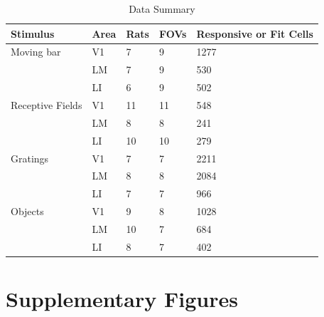 
\begin{table}[h]
  \caption{Data Summary}
  \centering
  \begin{tabular}{lllll}
    \toprule
    Stimulus & Area & Rats & FOVs & Responsive or Fit Cells   \\
    \midrule
    Moving bar & V1  & 7 & 9 & 1277        \\
               & LM  & 7 & 9 & 530         \\
               & LI  & 6 & 9 & 502          \\
    \midrule
    Receptive Fields & V1  & 11 & 11 & 548  \\
                     & LM  & 8 & 8 & 241   \\
                     & LI  & 10 & 10 & 279    \\
    \midrule
    Gratings & V1  & 7 & 7 & 2211     \\
             & LM  & 8 & 8 & 2084     \\
             & LI  & 7 & 7 & 966     \\
    \midrule
    Objects  & V1  & 9 & 8 & 1028   \\
             & LM  & 10 & 7 & 684   \\
             & LI  & 8 & 7 & 402    \\
    \bottomrule
  \end{tabular}
  \label{tab:data_counts}
\end{table}

\clearpage

\section{Supplementary Figures}

